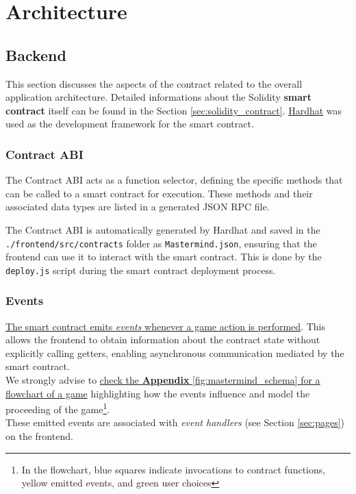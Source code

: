 \chapter{Architecture}
\section{Backend}
This section discusses the aspects of the contract related to the overall application architecture. Detailed informations about the Solidity \textbf{smart contract} itself can be found in the Section \ref{sec:solidity_contract}. \href{https://hardhat.org/}{Hardhat} was used as the development framework for the smart contract.

\subsection{Contract ABI}

The Contract ABI acts as a function selector, defining the specific methods that can be called to a smart contract for execution. These methods and their associated data types are listed in a generated JSON RPC file.

The Contract ABI is automatically generated by Hardhat and saved in the \texttt{./frontend/src/contracts} folder as \texttt{Mastermind.json}, ensuring that the frontend can use it to interact with the smart contract. This is done by the \texttt{deploy.js} script during the smart contract deployment process.

\subsection{Events}

\ul{The smart contract emits \textit{events} whenever a game action is performed}. This allows the frontend to obtain information about the contract state without explicitly calling getters, enabling asynchronous communication mediated by the smart contract. \\
We strongly advise to \ul{check the \textbf{Appendix} }\ref{fig:mastermind_schema}\ul{ for a flowchart of a game} highlighting how the events influence and model the proceeding of the game\footnote{In the flowchart,  blue squares indicate invocations to contract functions, yellow emitted events, and green user choices}.\\
These emitted events are associated with \textit{event handlers} (see Section \ref{sec:pages}) on the frontend.


